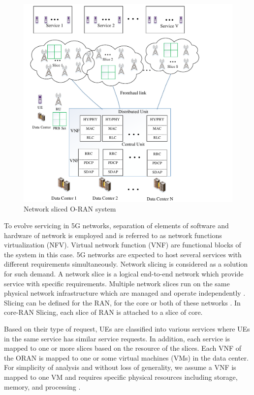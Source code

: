 \documentclass[conference]{IEEEtran}
\begin{document}
\begin{figure}
  \centering
    \includegraphics[scale=0.55]{c6.pdf}
  \caption{Network sliced O-RAN system}
  \label{fig:c11}
\end{figure}

To evolve servicing in 5G networks, separation of elements of software and hardware of network is employed and is referred to as network functions virtualization (NFV). Virtual network function (VNF) are functional blocks of the system in this case. 5G networks are expected to host several services with different requirements simultaneously. Network slicing is considered as a solution for such demand. A network slice is a logical end-to-end network which provide service with specific requirements. Multiple network slices run on the same physical network infrastructure which are managed and operate independently \cite{lee2018dynamic}. Slicing can be defined for the RAN, for the core or both of these networks \cite{ns1}. In core-RAN Slicing, each slice of RAN is attached to a slice of core.

Based on their type of request, UEs are classified into various services where UEs in the same service has similar service requests. In addition, each service is mapped to one or more slices based on the resource of the slices. Each VNF of the ORAN is mapped to one or some virtual machines (VMs) in the data center. For simplicity of analysis and without loss of generality, we assume a VNF is mapped to one VM and requires specific physical resources including storage, memory, and processing \cite{frdl,luong2018novel,luong2018novel1}.
\end{document}
